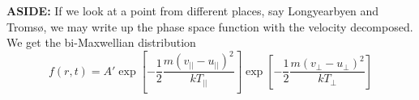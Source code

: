 \begin{txboxed}
\textbf{ASIDE:} If we look at a point from different places, say Longyearbyen and Tromsø, we may write up the phase space function with the velocity decomposed. We get the bi-Maxwellian distribution
\begin{equation*}
    f(r,t)=A'\exp\left[-\frac{1}{2}\frac{m{(v_{\vert\vert}-u_{\vert\vert})}^2}{kT_{\vert\vert}}\right]\exp\left[-\frac{1}{2}\frac{m{(v_{\perp}-u_{\perp})}^2}{kT_\perp}\right]
\end{equation*}
\end{txboxed}